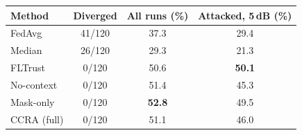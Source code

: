 \begin{tabular}{@{}lccc@{}}
\toprule
Method & Diverged & All runs (\%) & Attacked, 5\,dB (\%) \\
\midrule
FedAvg & 41/120 & 37.3 & 29.4 \\
Median & 26/120 & 29.3 & 21.3 \\
FLTrust & 0/120 & 50.6 & \textbf{50.1} \\
No-context & 0/120 & 51.4 & 45.3 \\
Mask-only & 0/120 & \textbf{52.8} & 49.5 \\
CCRA (full) & 0/120 & 51.1 & 46.0 \\
\bottomrule
\end{tabular}
